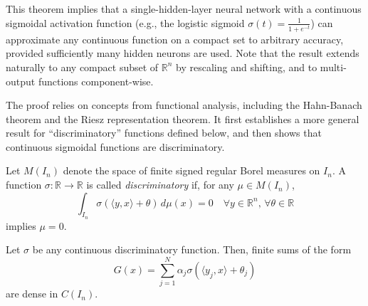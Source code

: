 This theorem implies that a single-hidden-layer neural network with a continuous sigmoidal activation function (e.g., the logistic sigmoid \( \sigma(t) = \frac{1}{1 + e^{-t}} \)) can approximate any continuous function on a compact set to arbitrary accuracy, provided sufficiently many hidden neurons are used. Note that the result extends naturally to any compact subset of \( \mathbb{R}^n \) by rescaling and shifting, and to multi-output functions component-wise.



The proof relies on concepts from functional analysis, including the Hahn-Banach theorem and the Riesz representation theorem. It first establishes a more general result for ``discriminatory'' functions defined below, and then shows that continuous sigmoidal functions are discriminatory.

\begin{definition}
Let \( M(I_n) \) denote the space of finite signed regular Borel measures on \( I_n \).
A function \( \sigma: \mathbb{R} \to \mathbb{R} \) is called {\em discriminatory} if, for any \( \mu \in M(I_n) \),
  \[
  \int_{I_n} \sigma(\langle y, x\rangle + \theta) \, d\mu(x) = 0 \quad \forall y \in \mathbb{R}^n, \, \forall \theta \in \mathbb{R}
  \]
  implies \( \mu = 0 \).
 \end{definition}


\begin{theorem} \label{th:UATgen} Let \( \sigma \) be any continuous discriminatory function. Then, finite sums of the form
\[
G(x) = \sum_{j=1}^N \alpha_j \sigma(\langle y_j, x\rangle + \theta_j)
\]
are dense in \( C(I_n) \).
\end{theorem}

